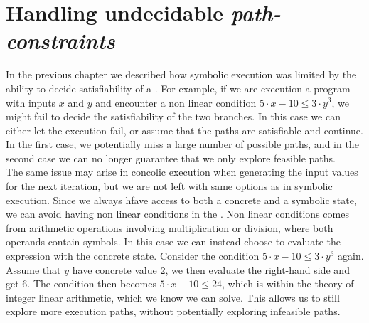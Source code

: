 \section{Handling undecidable \emph{path-constraints}} 
In the previous chapter we described how symbolic execution was limited by the ability to decide satisfiability of a \pc. For example, if we are execution a program with inputs $x$ and $y$ and encounter a non linear condition $ 5\cdot x - 10 \leq 3 \cdot y^3$, we might fail to decide the satisfiability of the two branches. In this case we can either let the execution fail, or assume that the paths are satisfiable and continue. In the first case, we potentially miss a large number of possible paths, and in the second case we can no longer guarantee that we only explore feasible paths.\\
The same issue may arise in concolic execution when generating the input values for the next iteration, but we are not left with same options as in symbolic execution. Since we always hfave access to both a concrete and a symbolic state, we can avoid having non linear conditions in the \pc. Non linear conditions comes from arithmetic operations involving multiplication or division, where both operands contain symbols. In this case we can instead choose to evaluate the expression with the concrete state. Consider the condition $ 5\cdot x - 10 \leq 3 \cdot y^3$ again. Assume that $y$ have concrete value $2$, we then evaluate the right-hand side and get $6$. The condition then becomes $ 5\cdot x - 10 \leq 24$, which is within the theory of integer linear arithmetic, which we know we can solve. This allows us to still explore more execution paths, without potentially exploring infeasible paths. 
